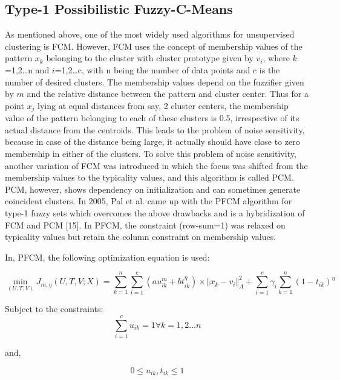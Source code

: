 \documentclass[journal, onecolumn]{IEEEtran}
\begin{document}
\subsection{Type-1 Possibilistic Fuzzy-C-Means}


As mentioned above, one of the most widely used algorithms for unsupervised clustering is FCM. However, FCM uses the concept of membership values of the pattern $x_k$ belonging to the cluster with cluster prototype given by $v_i$, where $k$=1,2…n and $i$=1,2…c, with n being the number of data points and c is the number of desired clusters. The membership values depend on the fuzzifier given by $m$ and the relative distance between the pattern and cluster center. Thus for a point $x_j$ lying at equal distances from say, 2 cluster centers, the membership value of the pattern belonging to each of these clusters is 0.5, irrespective of its actual distance from the centroids. This leads to the problem of noise sensitivity, because in case of the distance being large, it actually should have close to zero membership in either of the clusters. To solve this problem of noise sensitivity, another variation of FCM was introduced in which the focus was shifted from the membership values to the typicality values, and this algorithm is called PCM. PCM, however, shows dependency on initialization and can sometimes generate coincident clusters.  In 2005, Pal et al. came up with the PFCM algorithm for type-1 fuzzy sets which overcomes the above drawbacks and is a hybridization of FCM and PCM [15]. In PFCM, the constraint (row-sum=1) was relaxed on typicality values but retain the column constraint on membership values. 

In, PFCM, the following optimization equation is used: 


\begin{equation}
\min_{(U,T,V)} {J_{m,\eta}(U,T,V; X)=\sum_{k=1}^n \sum_{i=1}^c(au_{ik} ^m+ bt_{ik}^\eta)\times {\Vert x_k-v_i \Vert}_A^2+ \sum_{i=1}^c \gamma_i \sum_{k=1}^n(1-t_{ik})^\eta  }
\end{equation}

Subject to the constraints: 
\begin{equation}
\sum_{i=1}^c u_{ik} = 1  \forall  k=1,2...n 
\end{equation}

  and,
  
\begin{equation}
0\leq u_{ik}, t_{ik}\leq 1
\end{equation}
\end{document}
